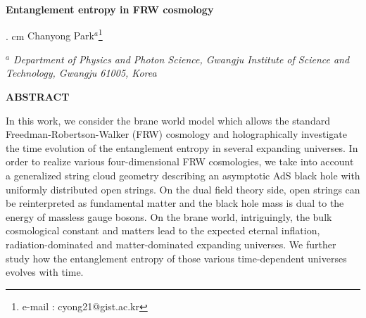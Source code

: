 \documentclass[12pt]{article}
\begin{document}
\def\vac#1{\mid #1 \rangle}



\def\td#1{\tilde{#1}}
\def\check{ \maltese {\bf Check!}}


\def\Tr{{\rm Tr}\,}
\def\det{{\rm det}}
\def\text#1{{\rm #1}}


\def\bc#1{\nnindent {\bf $\bullet$ #1} \\ }
\def\ch {$<Check!>$ }
\def\ss {\vspace{1.5cm}}
\def\inf{\infty}

\begin{titlepage}

\hfill\parbox{5cm} { }

 
\vspace{25mm}


\begin{center}
{\Large \bf  Entanglement entropy in FRW cosmology}

. cm
   {Chanyong Park$^{a}$\footnote{e-mail : cyong21@gist.ac.kr}}

\vskip 0.5cm

{\it $^a$ Department of Physics and Photon Science, Gwangju Institute of Science and Technology,  Gwangju  61005, Korea}

\end{center}

\thispagestyle{empty}

\vskip2cm


\centerline{\bf ABSTRACT} \vskip 4mm

\vspace{0.5cm}



In this work, we consider the brane world model which allows the standard Freedman-Robertson-Walker (FRW) cosmology and holographically investigate the time evolution of the entanglement entropy in several expanding universes. In order to realize various four-dimensional FRW cosmologies, we take into account a generalized string cloud geometry describing an asymptotic AdS black hole with uniformly distributed open strings. On the dual field theory side, open strings can be reinterpreted as fundamental matter and the black hole mass is dual to the energy of massless gauge bosons. On the brane world, intriguingly, the bulk cosmological constant and matters lead to the expected eternal inflation, radiation-dominated  and matter-dominated expanding universes. We further study how the entanglement entropy of those various time-dependent universes evolves with time.


\vspace{2cm}



\end{titlepage}
\end{document}
